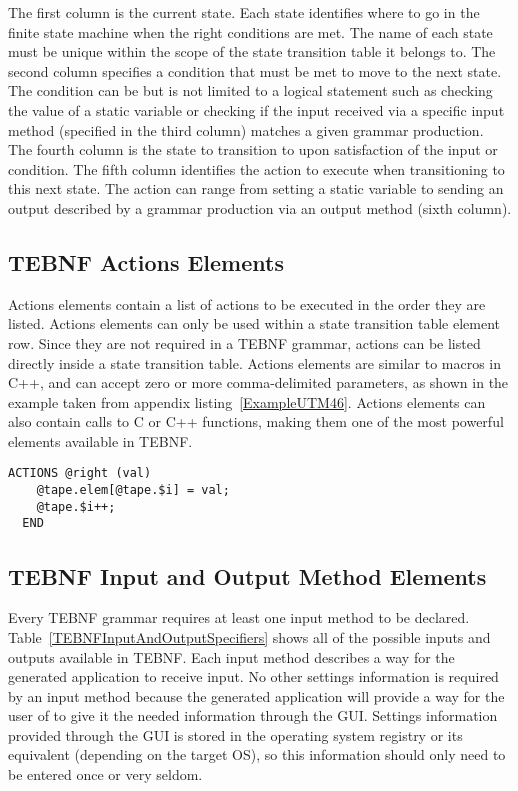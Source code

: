 \indent
The first column is the current state.  Each state identifies where to go in the finite state machine when the right conditions are met.  The name of each state must be unique within the scope of the state transition table it belongs to.  The second column specifies a condition that must be met to move to the next state.  The condition can be but is not limited to a logical statement such as checking the value of a static variable or checking if the input received via a specific input method (specified in the third column) matches a given grammar production.  The fourth column is the state to transition to upon satisfaction of the input or condition.  The fifth column identifies the action to execute when transitioning to this next state.  The action can range from setting a static variable to sending an output described by a grammar production via an output method (sixth column).

\subsection{TEBNF Actions Elements}
Actions elements contain a list of actions to be executed in the order they are listed.  Actions elements can only be used within a state transition table element row.  Since they are not required in a TEBNF grammar, actions can be listed directly inside a state transition table.  Actions elements are similar to macros in C++, and can accept zero or more comma-delimited parameters, as shown in the example taken from appendix listing~\ref{ExampleUTM46}.  Actions elements can also contain calls to C or C++ functions, making them one of the most powerful elements available in TEBNF.
\begin{lstlisting}[basicstyle=\small,caption={A TEBNF Actions element.},label=ExampleActionsElement]
  ACTIONS @right (val)
    @tape.elem[@tape.$i] = val;
    @tape.$i++;
  END
\end{lstlisting}

\subsection{TEBNF Input and Output Method Elements}
Every TEBNF grammar requires at least one input method to be declared.  Table~\ref{TEBNFInputAndOutputSpecifiers} shows all of the possible inputs and outputs available in TEBNF.  Each input method describes a way for the generated application to receive input.  No other settings information is required by an input method because the generated application will provide a way for the user of to give it the needed information through the GUI.  Settings information provided through the GUI is stored in the operating system registry or its equivalent (depending on the target OS), so this information should only need to be entered once or very seldom.

